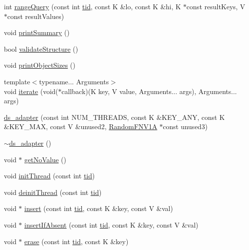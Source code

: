 \begin{DoxyCompactItemize}
\item 
int \hyperlink{classds__adapter_a23a9c8db5425e98a93d647df1c6c23dd}{range\+Query} (const int \hyperlink{microbench_2main_8cpp_a9ca9869868fe7e7a38a921cc7de4103f}{tid}, const K \&lo, const K \&hi, K $\ast$const result\+Keys, V $\ast$const result\+Values)
\item 
void \hyperlink{classds__adapter_aac97293215557665d2ef1e1a0d06fcfd}{print\+Summary} ()
\item 
bool \hyperlink{classds__adapter_ae50fe8a8683c0278cdd4c45e1405860d}{validate\+Structure} ()
\item 
void \hyperlink{classds__adapter_a33b13b7059a8c0345fb59a324dc3a691}{print\+Object\+Sizes} ()
\item 
{\footnotesize template$<$typename... Arguments$>$ }\\void \hyperlink{classds__adapter_ab1e0bb9a9b403ba68e85bf53219b1368}{iterate} (void($\ast$callback)(K key, V value, Arguments... args), Arguments... args)
\item 
\hyperlink{classds__adapter_a257791a567b56a61161d35a86c5cee49}{ds\+\_\+adapter} (const int N\+U\+M\+\_\+\+T\+H\+R\+E\+A\+DS, const K \&K\+E\+Y\+\_\+\+A\+NY, const K \&K\+E\+Y\+\_\+\+M\+AX, const V \&unused2, \hyperlink{classRandomFNV1A}{Random\+F\+N\+V1A} $\ast$const unused3)
\item 
\hyperlink{classds__adapter_a366f46dd39d59f2d4a147589f5fd98e3}{$\sim$ds\+\_\+adapter} ()
\item 
void $\ast$ \hyperlink{classds__adapter_adb631e454b8146520f601d1a86c6c72c}{get\+No\+Value} ()
\item 
void \hyperlink{classds__adapter_a3733f6a6b57312b1b5e4fb5181d82a0b}{init\+Thread} (const int \hyperlink{microbench_2main_8cpp_a9ca9869868fe7e7a38a921cc7de4103f}{tid})
\item 
void \hyperlink{classds__adapter_a173ca48b19fc1dc346159ea582c690cd}{deinit\+Thread} (const int \hyperlink{microbench_2main_8cpp_a9ca9869868fe7e7a38a921cc7de4103f}{tid})
\item 
void $\ast$ \hyperlink{classds__adapter_a8ade02abfaea48bedc69d41389562eeb}{insert} (const int \hyperlink{microbench_2main_8cpp_a9ca9869868fe7e7a38a921cc7de4103f}{tid}, const K \&key, const V \&val)
\item 
void $\ast$ \hyperlink{classds__adapter_a336af5f3838dbc78bb04f2a69f5b98fb}{insert\+If\+Absent} (const int \hyperlink{microbench_2main_8cpp_a9ca9869868fe7e7a38a921cc7de4103f}{tid}, const K \&key, const V \&val)
\item 
void $\ast$ \hyperlink{classds__adapter_ab6d8405f4336acb66453fdd95fae7b43}{erase} (const int \hyperlink{microbench_2main_8cpp_a9ca9869868fe7e7a38a921cc7de4103f}{tid}, const K \&key)

\end{DoxyCompactItemize}
